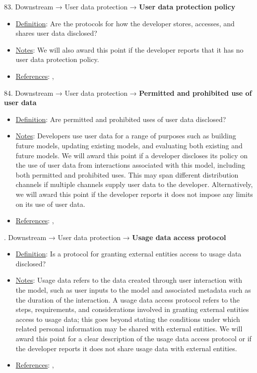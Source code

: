83. Downstream → User data protection → \textbf{User data protection policy}
\vspace{-\parskip}
\begin{itemize}
\item
\underline{Definition}: Are the protocols for how the developer stores, accesses, and shares user data disclosed?
\item
\underline{Notes}: We will also award this point if the developer reports that it has no user data protection policy.
\item
\underline{References}: \citet{nissenbaum2004contextual}, \citet{king2020privacy}
\end{itemize}


84. Downstream → User data protection → \textbf{Permitted and prohibited use of user data}
\vspace{-\parskip}
\begin{itemize}
\item
\underline{Definition}: Are permitted and prohibited uses of user data disclosed?
\item
\underline{Notes}: Developers use user data for a range of purposes such as building future models, updating existing models, and evaluating both existing and future models. We will award this point if a developer discloses its policy on the use of user data from interactions associated with this model, including both permitted and prohibited uses. This may span different distribution channels if multiple channels supply user data to the developer. Alternatively, we will award this point if the developer reports it does not impose any limits on its use of user data.
\item
\underline{References}: \citet{nissenbaum2004contextual}, \citet{king2020privacy}
\end{itemize}


. Downstream → User data protection → \textbf{Usage data access protocol}
\vspace{-\parskip}
\begin{itemize}
\item
\underline{Definition}: Is a protocol for granting external entities access to usage data disclosed?
\item
\underline{Notes}: Usage data refers to the data created through user interaction with the model, such as user inputs to the model and associated metadata such as the duration of the interaction. A usage data access protocol refers to the steps, requirements, and considerations involved in granting external entities access to usage data; this goes beyond stating the conditions under which related personal information may be shared with external entities. We will award this point for a clear description of the usage data access protocol or if the developer reports it does not share usage data with external entities.
\item
\underline{References}: \citet{lapowsky2018cambridge}, \citet{king2020privacy}
\end{itemize}


